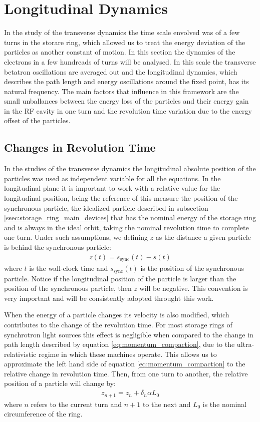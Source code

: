 \documentclass[
	12pt,				%
	openright,			%
	oneside,			%
	a4paper,		%
	chapter=TITLE,		%
	section=TITLE,		%
    brazil,				%
	english,			%
	sumario=tradicional,
	]{abntex2}
\begin{document}
  \section{Longitudinal Dynamics}

  In the study of the transverse dynamics the time scale envolved was of a few turns in the storare ring, which allowed us to treat the energy deviation of the particles as another constant of motion. In this section the dynamics of the electrons in a few hundreads of turns will be analysed. In this scale the transverse betatron oscillations are averaged out and the longitudinal dynamics, which describes the path length and energy oscillations around the fixed point, has its natural frequency. The main factors that influence in this framework are the small unballances between the energy loss of the particles and their energy gain in the RF cavity in one turn and the revolution time variation due to the energy offset of the particles.

    \subsection{Changes in Revolution Time}

	In the studies of the transverse dynamics the longitudinal absolute position of the particles was used as independent variable for all the equations. In the longitudinal plane it is important to work with a relative value for the longitudinal position, being the reference of this measure the position of the synchronous particle, the idealized particle described in subsection \ref{ssec:storage_ring_main_devices} that has the nominal energy of the storage ring and is always in the ideal orbit, taking the nominal revolution time to complete one turn. Under such assumptions, we defining $z$ as the distance a given particle is behind the synchronous particle:
	\begin{align}
		z(t) = s_\text{sync}(t) - s(t)
	\end{align}
	where $t$ is the wall-clock time and $s_\text{sync}(t)$ is the position of the synchronous particle. Notice if the longitudinal position of the particle is larger than the position of the synchronous particle, then $z$ will be negative. This convention is very important and will be consistently adopted throught this work.

    When the energy of a particle changes its velocity is also modified, which contributes to the change of the revolution time. For most storage rings of synchrotron light sources this effect is negligible when compared to the change in path length described by equation \ref{eq:momentum_compaction}, due to the ultra-relativistic regime in which these machines operate. This allows us to approximate the left hand side of equation \ref{eq:momentum_compaction} to the relative change in revolution time. Then, from one turn to another, the relative position of a particle will change by:
	\begin{align}\label{eq:revolution_time_variation}
		z_{n+1} = z_n + \delta_n\alpha L_0
	\end{align}
	where $n$ refers to the current turn and $n+1$ to the next and $L_0$ is the nominal circumference of the ring.
\end{document}

